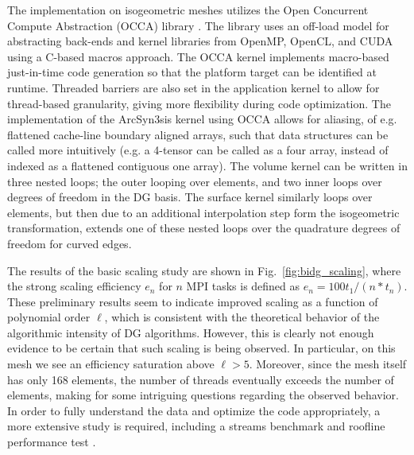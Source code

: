 The implementation on isogeometric meshes utilizes the Open Concurrent Compute Abstraction (OCCA) library \cite{MedinaPress}.  The library uses an off-load model for abstracting back-ends and kernel libraries from OpenMP, OpenCL, and CUDA using a C-based macros approach.  The OCCA kernel implements macro-based just-in-time code generation so that the platform target can be identified at runtime.  Threaded barriers are also set in the application kernel to allow for thread-based granularity, giving more flexibility during code optimization.  The implementation of the ArcSyn3sis kernel using OCCA allows for aliasing, of e.g. flattened cache-line boundary aligned arrays, such that data structures can be called more intuitively (e.g. a 4-tensor can be called as a four array, instead of indexed as a flattened contiguous one array).  The volume kernel can be written in three nested loops; the outer looping over elements, and two inner loops over degrees of freedom in the DG basis.  The surface kernel similarly loops over elements, but then due to an additional interpolation step form the isogeometric transformation, extends one of these nested loops over the quadrature degrees of freedom for curved edges.

The results of the basic scaling study are shown in Fig.~\ref{fig:bidg_scaling}, where the strong scaling efficiency $e_{n}$ for $n$ MPI tasks is defined as $e_{n}=100t_{1}/(n*t_{n})$.  These preliminary results seem to indicate improved scaling as a function of polynomial order $\ell$, which is consistent with the theoretical behavior of the algorithmic intensity of DG algorithms.  However, this is clearly not enough evidence to be certain that such scaling is being observed.  In particular, on this mesh we see an efficiency saturation above $\ell>5$.  Moreover, since the mesh itself has only 168 elements, the number of threads eventually exceeds the number of elements, making for some intriguing questions regarding the observed behavior.  In order to fully understand the data and optimize the code appropriately, a more extensive study is required, including a streams benchmark \cite{McCalpin1995} and roofline performance test \cite{Williams:2009:RIV:1498765.1498785}.


%
%






